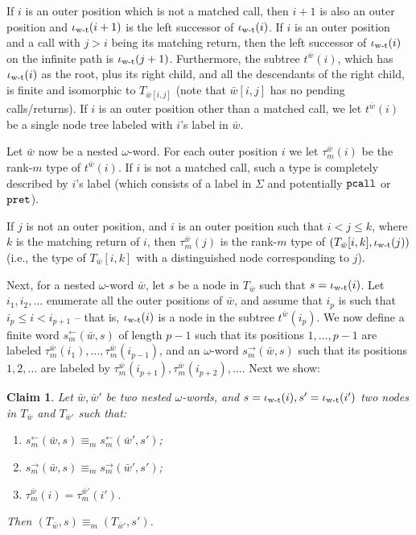 \documentclass{LMCS}
\newcommand{\w}{{\bar{w}}}
\newcommand{\wt}{\iota_{\text{\rm w-t}}}
\theoremstyle{plain}
\newtheorem{claim}[theorem]{Claim}
\theoremstyle{definition}
\newcommand{\pret}{\tt{pret}}
\newcommand{\pcall}{\tt{pcall}}
\newcommand{\sleft}{s^{\leftarrow}}
\newcommand{\sright}{s^{\rightarrow}}
\newcommand{\efeq}{\equiv}
\begin{document}
{If $i$ is an outer position which is not a matched call, then $i+1$ is
also an outer position and
$\wt(i+1)$ is the left successor of $\wt(i)$. If $i$ is an outer
position and a call with $j > i$ being its matching return, then the
left successor of $\wt(i)$ on the infinite path is
$\wt(j+1)$. Furthermore, the subtree $t^\w(i)$, which has $\wt(i)$ as the
root, plus its right child, and all the descendants of the right child, is
finite and isomorphic to $T_{\w[i,j]}$ (note that $\w[i,j]$ has no
pending calls/returns). If $i$ is an outer position other than a
matched call, we let $t^\w(i)$ be a
single node tree labeled with $i$'s label in $\w$.

Let $\w$ now be a nested $\omega$-word. For each outer position $i$
we let $\tau_m^\w(i)$ be the rank-$m$ type of $t^\w(i)$. If $i$ is not
a matched call, such a type is completely described by $i$'s label
(which consists of a label in $\Sigma$ and potentially $\pcall$ or
$\pret$). 

If $j$ is not
an outer position, and $i$ is an outer position such that $i < j \leq
k$, where $k$ is the matching return of $i$, then $\tau_m^\w(j)$ is
the rank-$m$ type of $(T_\w[i,k],\wt(j))$ (i.e., the type of
$T_\w[i,k]$ with a distinguished node corresponding to $j$).

Next, for a nested $\omega$-word $\w$, let $s$ be a node in $T_\w$
such that $s=\wt(i)$. Let $i_1,i_2,\ldots$ enumerate all the outer
positions of $\w$, and assume that $i_p$ is such that $i_p \leq i <
i_{p+1}$ -- that is, $\wt(i)$ is a node in the subtree $t^\w(i_p)$. We
now define a finite word $\sleft_m(\w,s)$ of length $p-1$ such that
its positions $1,\ldots,p-1$ are labeled $\tau_m^\w(i_1), \ldots,
\tau_m^\w(i_{p-1})$, and an $\omega$-word $\sright_m(\w,s)$ such that
its positions $1,2,\ldots$ are labeled by $\tau_m^\w(i_{p+1}),
\tau_m^\w(i_{p+2}), \ldots$. Next we show:

\begin{claim}
\label{nwtl-comp-claim}
Let $\w, \w'$ be two nested $\omega$-words, and $s=\wt(i), s'=\wt(i')$
two nodes in $T_\w$ and $T_{\w'}$ such that:
\begin{enumerate}[\em(a)]
\item $\sleft_m(\w,s) \efeq_m \sleft_m(\w',s')$;
\item $\sright_m(\w,s) \efeq_m \sright_m(\w',s')$;
\item $\tau_m^\w(i) = \tau_m^{\w'}(i')$.
\end{enumerate}
Then $(T_\w,s) \efeq_m (T_{\w'},s')$.
\end{claim}

}
\end{document}
